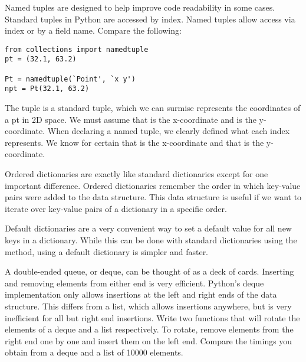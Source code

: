 Named tuples are designed to help improve code readability in some cases.
Standard tuples in Python are accessed by index.
Named tuples allow access via index or by a field name.
Compare the following:
\begin{lstlisting}
from collections import namedtuple
pt = (32.1, 63.2)

Pt = namedtuple(`Point', `x y')
npt = Pt(32.1, 63.2)
\end{lstlisting}
The tuple  is a standard tuple, which we can surmise represents the coordinates of a pt in 2D space.
We must assume that  is the x-coordinate and  is the y-coordinate.
When declaring a named tuple, we clearly defined what each index represents.
We know for certain that  is the x-coordinate and that  is the y-coordinate.

Ordered dictionaries are exactly like standard dictionaries except for one important difference.
Ordered dictionaries remember the order in which key-value pairs were added to the data structure.
This data structure is useful if we want to iterate over key-value pairs of a dictionary in a specific order.

Default dictionaries are a very convenient way to set a default value for all new keys in a dictionary.
While this can be done with standard dictionaries using the  method, using a default dictionary is simpler and faster.

\begin{problem}
A double-ended queue, or deque, can be thought of as a deck of cards.
Inserting and removing elements from either end is very efficient.
Python's deque implementation only allows insertions at the left and right ends of the data structure.
This differs from a list, which allows insertions anywhere, but is very inefficient for all but right end insertions.
Write two functions that will rotate the elements of a deque and a list respectively.
To rotate, remove elements from the right end one by one and insert them on the left end.
Compare the timings you obtain from a deque and a list of 10000 elements.
\end{problem}
